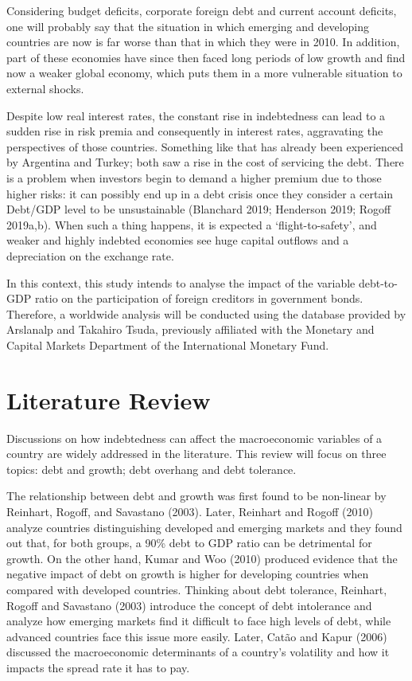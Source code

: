 \documentclass[]{article}
\begin{document}
Considering budget deficits, corporate foreign debt and current account
deficits, one will probably say that the situation in which emerging and
developing countries are now is far worse than that in which they were
in 2010. In addition, part of these economies have since then faced long
periods of low growth and find now a weaker global economy, which puts
them in a more vulnerable situation to external shocks.

Despite low real interest rates, the constant rise in indebtedness can
lead to a sudden rise in risk premia and consequently in interest rates,
aggravating the perspectives of those countries. Something like that has
already been experienced by Argentina and Turkey; both saw a rise in the
cost of servicing the debt. There is a problem when investors begin to
demand a higher premium due to those higher risks: it can possibly end
up in a debt crisis once they consider a certain Debt/GDP level to be
unsustainable (Blanchard 2019; Henderson 2019; Rogoff 2019a,b). When
such a thing happens, it is expected a `flight-to-safety', and weaker
and highly indebted economies see huge capital outflows and a
depreciation on the exchange rate.

In this context, this study intends to analyse the impact of the
variable debt-to-GDP ratio on the participation of foreign creditors in
government bonds. Therefore, a worldwide analysis will be conducted
using the database provided by Arslanalp and Takahiro Tsuda, previously
affiliated with the Monetary and Capital Markets Department of the
International Monetary Fund.

\section{Literature Review}\label{literature-review}

Discussions on how indebtedness can affect the macroeconomic variables
of a country are widely addressed in the literature. This review will
focus on three topics: debt and growth; debt overhang and debt
tolerance.

The relationship between debt and growth was first found to be
non-linear by Reinhart, Rogoff, and Savastano (2003). Later, Reinhart
and Rogoff (2010) analyze countries distinguishing developed and
emerging markets and they found out that, for both groups, a 90\% debt
to GDP ratio can be detrimental for growth. On the other hand, Kumar and
Woo (2010) produced evidence that the negative impact of debt on growth
is higher for developing countries when compared with developed
countries. Thinking about debt tolerance, Reinhart, Rogoff and Savastano
(2003) introduce the concept of debt intolerance and analyze how
emerging markets find it difficult to face high levels of debt, while
advanced countries face this issue more easily. Later, Catão and Kapur
(2006) discussed the macroeconomic determinants of a country's
volatility and how it impacts the spread rate it has to pay.
\end{document}
